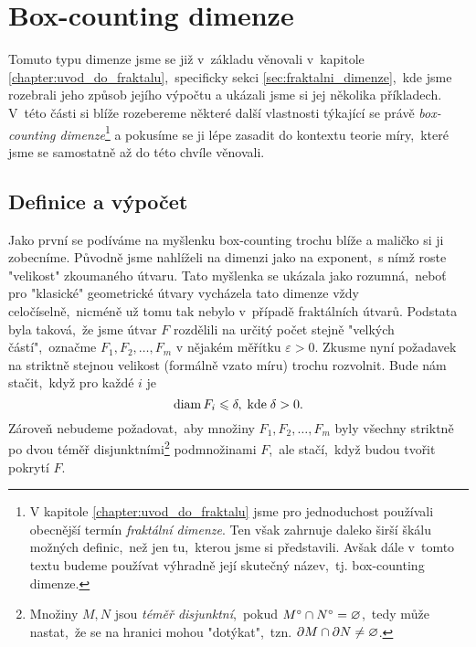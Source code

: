 \section{Box-counting dimenze}\label{sec:box-counting-dimenze}

Tomuto typu dimenze jsme se již v~základu věnovali v~kapitole \ref{chapter:uvod_do_fraktalu},~specificky sekci \ref{sec:fraktalni_dimenze},~kde jsme rozebrali jeho způsob jejího výpočtu a ukázali jsme si jej několika příkladech. V~této části si blíže rozebereme některé další vlastnosti týkající se právě \emph{box-counting dimenze}\footnote{V kapitole \ref{chapter:uvod_do_fraktalu} jsme pro jednoduchost používali obecnější termín \emph{fraktální dimenze}. Ten však zahrnuje daleko širší škálu možných definic,~než jen tu,~kterou jsme si představili. Avšak dále v~tomto textu budeme používat výhradně její skutečný název,~tj. box-counting dimenze.} a pokusíme se ji lépe zasadit do kontextu teorie míry,~které jsme se samostatně až do této chvíle věnovali.

\subsection{Definice a výpočet}\label{subsec:definice-a-vypocet-bc-dimenze}

Jako první se podíváme na myšlenku box-counting trochu blíže a maličko si ji zobecníme. Původně jsme nahlíželi na dimenzi jako na exponent,~s nímž roste "velikost" zkoumaného útvaru. Tato myšlenka se ukázala jako rozumná,~neboť pro "klasické" geometrické útvary vycházela tato dimenze vždy celočíselně,~nicméně už tomu tak nebylo v~případě fraktálních útvarů. Podstata byla taková,~že jsme útvar $F$ rozdělili na určitý počet stejně "velkých částí",~označme $F_1,F_2,\ldots,F_m$ v nějakém měřítku $\varepsilon>0$. Zkusme nyní požadavek na striktně stejnou velikost (formálně vzato míru) trochu rozvolnit. Bude nám stačit,~když pro každé $i$ je
\[\operatorname{diam}{F_i}\leqslant\delta,\;\text{kde}\;\delta>0.\]
Zároveň nebudeme požadovat,~aby množiny $F_1,F_2,\ldots,F_m$ byly všechny striktně po dvou téměř disjunktními\footnote{Množiny $M,N$ jsou \emph{téměř disjunktní},~pokud $M^\circ\cap N^\circ=\varnothing$,~tedy může nastat,~že se na hranici mohou "dotýkat",~tzn. $\partial M\cap\partial N\neq\varnothing$.} podmnožinami $F$,~ale stačí,~když budou tvořit pokrytí $F$.

